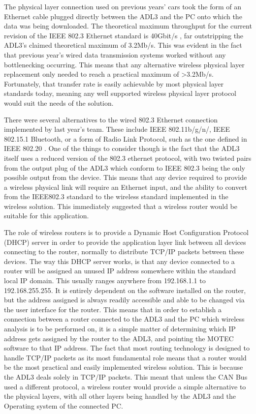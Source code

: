 The physical layer connection used on previous years' cars took the form of an Ethernet cable plugged directly between the ADL3 and the PC onto which the data was being downloaded. The theoretical maximum throughput for the current revision of the IEEE 802.3 Ethernet standard is 40Gbit/s \cite{802_3}, far outstripping the ADL3's claimed theoretical maximum of 3.2Mb/s\cite{MAN_ADL3}. This was evident in the fact that previous year's wired data transmission systems worked without any bottlenecking occurring. This means that any alternative wireless physical layer replacement only needed to reach a practical maximum of >3.2Mb/s. Fortunately, that transfer rate is easily achievable by most physical layer standards today, meaning any well supported wireless physical layer protocol would suit the needs of the solution.

There were several alternatives to the wired 802.3 Ethernet connection implemented by last year's team. These include IEEE 802.11b/g/n/, IEEE 802.15.1 Bluetooth, or a form of Radio Link Protocol, such as the one defined in IEEE 802.20 \cite{802_20}. One of the things to consider though is the fact that the ADL3 itself uses a reduced version of the 802.3 ethernet protocol, with two twisted pairs from the output plug of the ADL3 which conform to IEEE 802.3 being the only possible output from the device\cite{MAN_ADL3}. This means that any device required to provide a wireless physical link will require an Ethernet input, and the ability to convert from the IEEE802.3 standard to the wireless standard implemented in the wireless solution. This immediately suggested that a wireless router would be suitable for this application.

The role of wireless routers is to provide a Dynamic Host Configuration Protocol (DHCP) server in order to provide the application layer link between all devices connecting to the router, normally to distribute TCP/IP packets between these devices\cite{doyle2005routing}. The way this DHCP server works, is that any device connected to a router will be assigned an unused IP address somewhere within the standard local IP domain. This usually ranges anywhere from 192.168.1.1 to 192.168.255.255\cite{MAN_OPENWRT}. It is entirely dependent on the software installed on the router, but the address assigned is always readily accessible and able to be changed via the user interface for the router\cite{MAN_OPENWRT}. This means that in order to establish a connection between a router connected to the ADL3 and the PC which wireless analysis is to be performed on, it is a simple matter of determining which IP address gets assigned by the router to the ADL3, and pointing the MOTEC software to that IP address\cite{MAN_ADL3}. The fact that most routing technology is designed to handle TCP/IP packets as its most fundamental role means that a router would be the most practical and easily implemented wireless solution. This is because the ADL3 deals solely in TCP/IP packets. This meant that unless the CAN Bus used a different protocol, a wireless router would provide a simple alternative to the physical layers, with all other layers being handled by the ADL3 and the Operating system of the connected PC.

